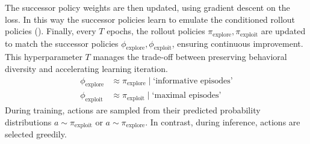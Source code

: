 \documentclass{article}
\begin{document}
The successor policy weights are then updated, using gradient descent on the loss. In this way the successor policies learn to emulate the conditioned rollout policies ().
Finally, every \(T\) epochs, the rollout policies \(\pi_{\text{explore}}, \pi_{\text{exploit}}\) are updated to match the successor policies \(\phi_{\text{explore}}, \phi_{\text{exploit}}\), ensuring continuous improvement. This hyperparameter \(T\) manages the trade-off between preserving behavioral diversity and accelerating learning iteration.
\begin{align}
\phi_{\text{explore}} &\approx \pi_{\text{explore}} \mid \text{`informative episodes’}\nonumber\\
\phi_{\text{exploit}} &\approx \pi_{\text{exploit}} \mid \text{`maximal episodes’}
\label{eq2}
\end{align}
During training, actions are sampled from their predicted probability distributions \(a \sim \pi_\text{exploit}\) or \(a \sim \pi_\text{explore}\). In contrast, during inference, actions are selected greedily.
\end{document}
